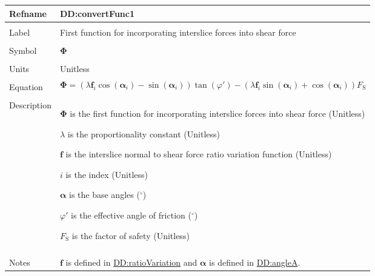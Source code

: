 \documentclass[12pt]{article}
\begin{document}
\vspace{\baselineskip}
\noindent
\begin{minipage}{\textwidth}
\begin{tabular}{>{\raggedright}p{}>{\raggedright\arraybackslash}p{}}
\toprule \textbf{Refname} & \textbf{DD:convertFunc1}
\label{DD:convertFunc1}
\\ \midrule \\
Label & First function for incorporating interslice forces into shear force
        
\\ \midrule \\
Symbol & $\symbf{Φ}$
         
\\ \midrule \\
Units & Unitless
        
\\ \midrule \\
Equation & \begin{displaymath}
           \symbf{Φ}=\left(λ {\symbf{f}}_{i} \cos\left({\symbf{α}}_{i}\right)-\sin\left({\symbf{α}}_{i}\right)\right) \tan\left(φ'\right)-\left(λ {\symbf{f}}_{i} \sin\left({\symbf{α}}_{i}\right)+\cos\left({\symbf{α}}_{i}\right)\right) {F_{\text{S}}}
           \end{displaymath}
\\ \midrule \\
Description & \begin{symbDescription}
              \item{$\symbf{Φ}$ is the first function for incorporating interslice forces into shear force (Unitless)}
              \item{$λ$ is the proportionality constant (Unitless)}
              \item{$\symbf{f}$ is the interslice normal to shear force ratio variation function (Unitless)}
              \item{$i$ is the index (Unitless)}
              \item{$\symbf{α}$ is the base angles (${{}^{\circ}}$)}
              \item{$φ'$ is the effective angle of friction (${{}^{\circ}}$)}
              \item{${F_{\text{S}}}$ is the factor of safety (Unitless)}
              \end{symbDescription}
\\ \midrule \\
Notes & $\symbf{f}$ is defined in \hyperref[DD:ratioVariation]{DD:ratioVariation} and $\symbf{α}$ is defined in \hyperref[DD:angleA]{DD:angleA}.
        

\end{tabular}
\end{minipage}
\end{document}
